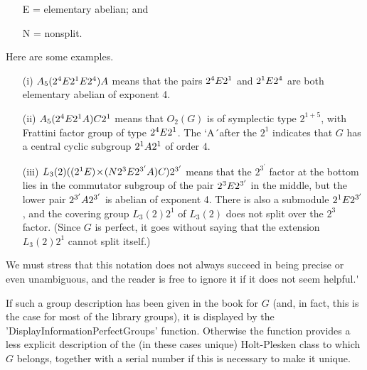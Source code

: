 {\begin{itemize}
\item[E] = elementary abelian; and \vspace{-2mm}
\item[N] = nonsplit. \vspace{-2mm}
\end{itemize}
Here are some examples.
\vspace{-2mm}
\begin{itemize}
\item[(i)]  $A_5 (2^4 {\sl E} 2^1 {\sl E} 2^4) {\sl A}$  means  that  the
      pairs  $2^4 {\sl E} 2^1$  and $2^1 {\sl E} 2^4$ are both elementary
      abelian of exponent 4. \vspace{-1mm}
\item[(ii)]   $A_5 (2^4 {\sl E} 2^1 {\sl A}) {\sl C} 2^1$    means   that
      $O_2(G)$  is of  symplectic type  $2^{1+5}$,  with  Frattini factor
      group  of type   $2^4 {\sl E} 2^1$.   The   `A\'\  after the  $2^1$
      indicates that $G$ has a  central cyclic subgroup $2^1 {\sl A} 2^1$
      of order 4. \vspace{-1mm}
\item[(iii)]     $L_3(2) ((2^1 {\sl E}) \! \times \! ({\sl N} 2^3 {\sl E}
      2^{3^\prime} {\sl A}) {\sl C}) 2^{3^\prime}$    means   that    the
      $2^{3^\prime}$ factor at the bottom lies in the commutator subgroup
      of the pair $2^3 {\sl E} 2^{3^\prime}$ in the middle, but the lower
      pair $2^{3^\prime} {\sl A} 2^{3^\prime}$  is abelian of exponent 4.
      There  is  also  a submodule  $2^1 {\sl E} 2^{3^\prime}$,  and  the
      covering group  $L_3(2) 2^1$  of  $L_3(2)$  does not split over the
      $2^3$  factor.  (Since $G$ is perfect,  it goes without saying that
      the extension $L_3(2) 2^1$ cannot split itself.) \vspace{-2mm}
\end{itemize}

We  must  stress  that this  notation does   not  always succeed in being
precise  or even unambiguous, and the  reader is free to  ignore it if it
does not seem helpful.\' }

If such a group description has  been given in  the book for $G$ (and, in
fact, this is the case for  most of the library  groups), it is displayed
by the 'DisplayInformationPerfectGroups' function. Otherwise the function
provides a less explicit  description  of  the  (in these cases   unique)
Holt-Plesken class to which $G$ belongs, together with a serial number if
this is necessary to make it unique.

